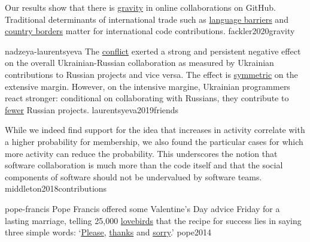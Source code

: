 \documentclass{article}
\begin{document}
  {Our results show that there is \ul{gravity} in online collaborations on GitHub. Traditional determinants of international trade such as \ul{language barriers} and \ul{country borders} matter for international code contributions.}
  {fackler2020gravity}

\lnQuote
  {nadzeya-laurentsyeva}
  {The \ul{conflict} exerted a strong and persistent negative effect on the overall
  Ukrainian-Russian collaboration as measured by Ukrainian contributions
  to Russian projects and vice versa. The effect is \ul{symmetric} on the extensive margin.
  However, on the intensive margine, Ukrainian programmers react stronger: conditional
  on collaborating with Russians, they contribute to \ul{fewer} Russian projects.}
  {laurentsyeva2019friends}

  {While we indeed find support for the idea that increases in activity correlate with a higher probability for membership, we also found the particular cases for which more activity can reduce the probability. This underscores the notion that software collaboration is much more than the code itself and that the social components of software should not be undervalued by software teams.}
  {middleton2018contributions}

\lnQuote
  {pope-francis}
  {Pope Francis offered some Valentine’s Day advice Friday for a lasting marriage, telling 25,000 \ul{lovebirds} that the recipe for success lies in saying three simple words: `\ul{Please}, \ul{thanks} and \ul{sorry}.'{}}
  {pope2014}
\end{document}
